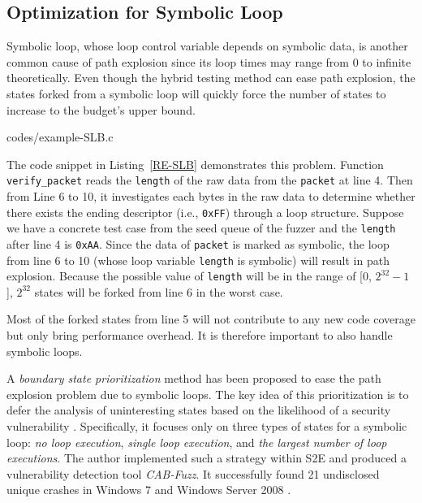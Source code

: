 \subsection{Optimization for Symbolic Loop}
Symbolic loop, whose loop control variable depends on symbolic data, 
is another common cause of path explosion since its loop times may 
range from 0 to infinite theoretically. 
Even though the hybrid testing method can ease path explosion, the 
states forked from a symbolic loop will quickly force the number of 
states to increase to the budget's upper bound. 


{codes/example-SLB.c} 

The code snippet in Listing~\ref{RE-SLB} demonstrates this problem. 
Function \texttt{verify\_packet} reads the \texttt{length} of the 
raw data from the \texttt{packet} at line 4.
 Then from Line 6 to 10, it investigates each bytes in the raw data 
 to determine whether there exists the ending descriptor 
 (i.e., \texttt{0xFF}) through a loop structure. 
 Suppose we have a concrete test case from the seed queue of 
 the fuzzer and the \texttt{length} after line 4 is \texttt{0xAA}. 
 Since the data of \texttt{packet} is marked as symbolic, the loop 
 from line 6 to 10 (whose loop variable \texttt{length} is symbolic) 
 will result in path explosion.
 Because the possible value of \texttt{length} will be in the 
 range of [0, $2^{32}-1$], $2^{32}$ states will be forked from 
 line 6 in the worst case. 
 
Most of the forked states from line 5 will not contribute 
to any new code coverage but only bring performance overhead.
It is therefore important to also handle symbolic loops. 

A \textit{boundary state prioritization} method has been proposed 
to ease the path explosion problem due to symbolic loops.
The key idea of this prioritization is to defer the analysis of 
uninteresting states based on the likelihood of a security vulnerability \cite{cab-fuzz}. 
Specifically, it focuses only on three types of states for a symbolic 
loop: \textit{no loop execution}, \textit{single loop execution}, and 
\textit{the largest number of loop executions}.
The author implemented such a strategy within S2E \cite{chipounov2011s2e} 
and produced a vulnerability detection tool \textit{CAB-Fuzz}.
It successfully found 21 undisclosed unique crashes in Windows 7 and 
Windows Server 2008 \cite{cab-fuzz}.
 
